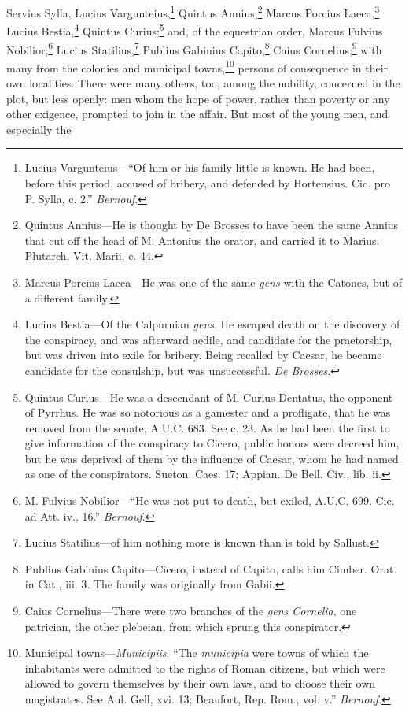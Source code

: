 Servius Sylla, Lucius Vargunteius,\footnote{Lucius Vargunteius—``Of him or his family little is known.
He had been, before this period, accused of bribery, and defended by
Hortensius. Cic. pro P. Sylla, c. 2.'' \emph{Bernouf}.} Quintus Annius,\footnote{Quintus Annius—He is thought by De Brosses to have been the same
Annius that cut off the head of M. Antonius the orator, and carried it
to Marius. Plutarch, Vit. Marii, c. 44.} Marcus
Porcius Laeca,\footnote{Marcus Porcius Laeca—He was one of the same \emph{gens} with the
Catones, but of a different family.} Lucius Bestia,\footnote{Lucius Bestia—Of the Calpurnian \emph{gens}. He escaped death
on the discovery of the conspiracy, and was afterward aedile, and
candidate for the praetorship, but was driven into exile for bribery.
Being recalled by Caesar, he became candidate for the consulship, but
was unsuccessful. \emph{De Brosses}.} Quintus Curius;\footnote{Quintus Curius—He was a descendant of M. Curius Dentatus, the
opponent of Pyrrhus. He was so notorious as a gamester and a profligate,
that he was removed from the senate, A.U.C. 683. See c. 23. As he had
been the first to give information of the conspiracy to Cicero, public
honors were decreed him, but he was deprived of them by the influence of
Caesar, whom he had named as one of the conspirators. Sueton. Caes. 17;
Appian. De Bell. Civ., lib. ii.} and, of
the equestrian order, Marcus Fulvius Nobilior,\footnote{M. Fulvius Nobilior—``He was not put to death, but exiled,
A.U.C. 699. Cic. ad Att. iv., 16.'' \emph{Bernouf}.} Lucius
Statilius,\footnote{Lucius Statilius—of him nothing more is known than is told by
Sallust.} Publius Gabinius Capito,\footnote{Publius Gabinius Capito—Cicero, instead of Capito, calls him
Cimber. Orat. in Cat., iii. 3. The family was originally from Gabii.} Caius Cornelius;\footnote{Caius Cornelius—There were two branches of the \emph{gens Cornelia},
one patrician, the other plebeian, from which sprung this conspirator.}
with many from the colonies and municipal towns,\footnote{Municipal towns—\emph{Municipiis}. ``The \emph{municipia} were towns
of which the inhabitants were admitted to the rights of Roman citizens,
but which were allowed to govern themselves by their own laws, and to
choose their own magistrates. See Aul. Gell, xvi. 13; Beaufort, Rep.
Rom., vol. v.'' \emph{Bernouf}.} persons of
consequence in their own localities. There were many others, too,
among the nobility, concerned in the plot, but less openly: men whom
the hope of power, rather than poverty or any other exigence, prompted
to join in the affair. But most of the young men, and especially the
